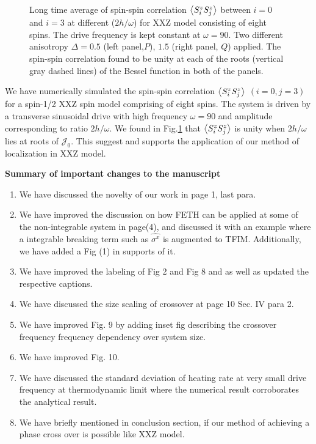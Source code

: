 \documentclass[aps,prb,reprint,showpacs,floatfix,superscriptaddress, onecolumn, nofootinbib, 9pt]{revtex4-2}
\begin{document}
\begin{enumerate}
{\begin{figure}[t]
		\caption{Long time average of spin-spin correlation $\expval{S^z_i S^z_{j}}$ between $i=0$ and $i=3$ at different ($2h/\omega$) for XXZ model consisting of eight spins. The drive frequency is kept constant at $\omega = 90$. Two different anisotropy $\Delta = 0.5$ (left panel,$P$), $1.5$ (right panel, $Q$) applied. The spin-spin correlation found to be unity at each of the roots (vertical gray dashed lines) of the Bessel function in both of the panels.}
		\label{fig:std_Ns}
	\end{figure}
	We have numerically simulated the spin-spin correlation $\expval{S^z_i S^z_j}$ $(i=0,j=3)$ for a spin-1/2 XXZ spin model comprising of eight spins. The system is driven by a transverse sinusoidal drive with high frequency $\omega =90$ and amplitude corresponding to ratio $2h/\omega$. We found in Fig.\ref{fig:std_Ns} that $\expval{S^z_i S^z_j}$ is unity when $2h/\omega$ lies at roots of $\mathcal{J}_0$. This suggest  and supports the application of our method of localization in XXZ model.
	}
	\end{enumerate}

	\vskip 1cm 
	\noindent \textbf{Summary of important changes to the  manuscript}
	
	\begin{enumerate}
		\item We have discussed the novelty of our work in page 1, last para.
		\item We have improved the discussion on how FETH can be applied at some of the non-integrable system in page(4), and discussed it with an example where a integrable breaking term such as $\hat{\sigma^x}$ is augmented to TFIM. Additionally, we have added a Fig (1) in supports of it.
		\item We have improved the labeling of Fig 2 and Fig 8 and as well as updated the respective captions.
		\item We have discussed the size scaling of crossover at page 10 Sec. IV para 2.
		\item We have improved Fig. 9 by adding inset fig describing the crossover frequency frequency dependency over system size.
		\item We have improved Fig. 10.
		\item We have discussed the standard deviation of heating rate at very small drive frequency at thermodynamic limit where the numerical result corroborates the analytical result.
		\item We have briefly mentioned in conclusion section, if our method of achieving a phase cross over is possible like XXZ model. 
	\end{enumerate}
	
	
	
	
\end{document}
